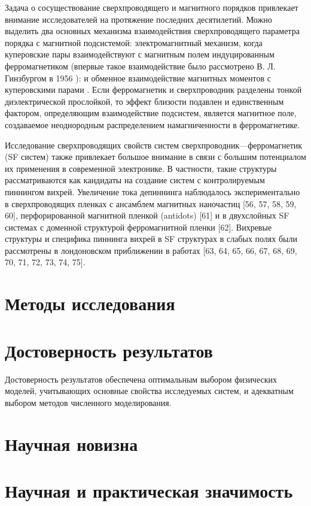 Задача о сосуществование сверхпроводящего и магнитного порядков привлекает 
внимание исследователей на протяжение последних десятилетий. Можно выделить 
два основных механизма взаимодействия сверхпроводящего параметра порядка с 
магнитной подсистемой: электромагнитный механизм, когда куперовские пары 
взаимодействуют с магнитным полем индуцированным ферромагнетиком (впервые 
такое взаимодействие было рассмотрено В. Л. Гинзбургом в 1956 
\cite{ginzburg}): и обменное взаимодействие магнитных моментов с куперовскими 
парами \cite{buzdin,bulaev}. Если ферромагнетик и сверхпроводник разделены 
тонкой диэлектрической прослойкой, то эффект близости подавлен и единственным 
фактором, определяющим взаимодействие подсистем, является магнитное поле, 
создаваемое неоднородным распределением намагниченности в ферромагнетике.

Исследование сверхпроводящих свойств систем сверхпроводник—ферромагнетик (SF 
систем) также привлекает большое внимание в связи с большим потенциалом их 
применения в современной электронике. В частности, такие структуры 
рассматриваются как кандидаты на создание систем с контролируемым пиннингом 
вихрей. Увеличение тока депиннинга наблюдалось экспериментально в 
сверхпроводящих пленках с ансамблем магнитных наночастиц [56, 57, 58, 59, 60], 
перфорированной магнитной пленкой (antidots) [61] и в двухслойных SF системах 
с доменной структурой ферромагнитной пленки [62]. Вихревые структуры и 
специфика пиннинга вихрей в SF структурах в слабых полях были рассмотрены в 
лондоновском приближении в работах 
[63, 64, 65, 66, 67, 68, 69, 70, 71, 72, 73, 74, 75].

\section{Методы исследования}

\section{Достоверность результатов}

Достоверность результатов обеспечена оптимальным выбором физических моделей, 
учитывающих основные свойства исследуемых систем, и адекватным выбором 
методов численного моделирования.

\section{Научная новизна}

\section{Научная и практическая значимость}